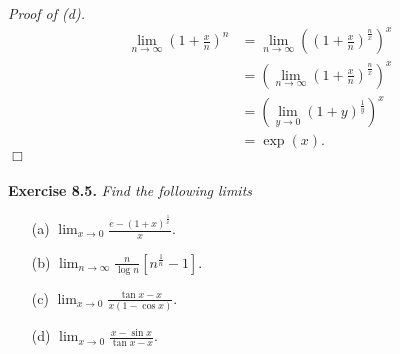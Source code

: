 \documentclass{article}
\begin{document}
\emph{Proof of (d).}
\begin{align*}
  \lim_{n \to \infty} \left( 1 + \frac{x}{n} \right)^{n}
  &= \lim_{n \to \infty} \left( \left( 1 + \frac{x}{n} \right)^{\frac{n}{x}} \right)^{x} \\
  &= \left( \lim_{n \to \infty} \left( 1 + \frac{x}{n} \right)^{\frac{n}{x}} \right)^{x} \\
  &= \left( \lim_{y \to 0} (1+y)^{\frac{1}{y}} \right)^{x} \\
  &= \exp(x).
\end{align*}
$\Box$ \\\\






\textbf{Exercise 8.5.}
\emph{Find the following limits}
\begin{enumerate}
  \item[(a)]
  $\lim_{x \to 0} \frac{e-(1+x)^{\frac{1}{x}}}{x}.$
  \item[(b)]
  $\lim_{n \to \infty} \frac{n}{\log n}\left[ n^{\frac{1}{n}} - 1 \right].$
  \item[(c)]
  $\lim_{x \to 0} \frac{\tan x - x}{x(1 - \cos x)}.$
  \item[(d)]
  $\lim_{x \to 0} \frac{x - \sin x}{\tan x - x}.$ \\
\end{enumerate}
\end{document}
